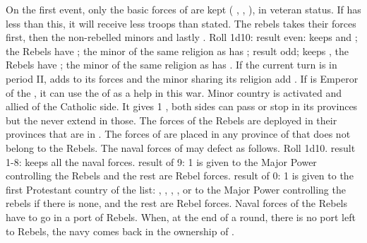 \begin{digressions}
  \phevnt
  \aparag On the first event, only the basic forces of \FRA are kept (\ARMY
  \faceplus, \ARMY \facemoins, \DT), in veteran status.  If \FRA has less than
  this, it will receive less troops than stated. The rebels takes their forces
  first, then the non-rebelled minors and lastly \FRA.
  \aparag Roll 1d10:
  \bparag result even: \FRA keeps \ARMY \facemoins and \DT; the Rebels have
  \ARMY \facemoins; the minor of the same religion as \FRA has \ARMY
  \facemoins;
  \bparag result odd; \FRA keeps \DT, the Rebels have \ARMY \faceplus; the
  minor of the same religion as \FRA has \ARMY \facemoins.
  \aparag If the current turn is in period II, \FRA adds \ARMY \facemoins to
  its forces and the minor sharing its religion add \DT.
  \aparag If \FRA is Emperor of the \HRE, it can use the \ARMY of \HRE as a
  help in this war.
  \aparag Minor country \paysLorraine is activated and allied of the Catholic
  side. It gives 1 \DT, both sides can pass or stop in its provinces but the
  \REVOLT never extend in those.
  \aparag The forces of the Rebels are deployed in their provinces that are in
  \REVOLT .  The forces of \FRA are placed in any province of \FRA that does
  not belong to the Rebels.
  \aparag The naval forces of \FRA may defect as follows. Roll 1d10.
  \bparag result 1-8: \FRA keeps all the naval forces.
  \bparag result of 9: 1 \DN is given to the Major Power controlling the
  Rebels and the rest are Rebel forces.
  \bparag result of 0: 1 \DN is given to the first Protestant country of the
  list: \HOL, \ENG, \SUE, \POL, or to the Major Power controlling the rebels
  if there is none, and the rest are Rebel forces.
  \bparag Naval forces of the Rebels have to go in a port of Rebels.  When, at
  the end of a round, there is no port left to Rebels, the navy comes back in
  the ownership of \FRA.


\end{digressions}
